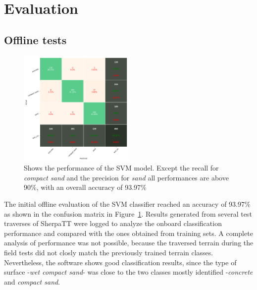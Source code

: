 \documentclass{article}
\begin{document}
\section{Evaluation}
\subsection{Offline tests}

\begin{figure}[h]
\centering
\includegraphics[width=0.5\textwidth]{../figures/confusionmatrix_Train.png}
\caption{\label{fig:confusionmatrix} Shows the performance of the SVM model. Except the recall for \emph{compact sand} and the precision for \emph{sand} all performances are above 90\%, with an overall accuracy of 93.97\%}
\end{figure}


The initial offline evaluation of the SVM classifier reached an accuracy of 93.97\% as shown in the confusion matrix in Figure~\ref{fig:confusionmatrix}.
Results generated from several test traverses of SherpaTT were logged to analyze the onboard classification performance and compared with the ones obtained from training sets. A complete analysis of performance was not possible, because the traversed terrain during the field tests did not closly match the previously trained terrain classes. Nevertheless, the software shows good classification results, since the type of surface -\emph{wet compact sand}- was close to the two classes mostly identified -\emph{concrete} and \emph{compact sand}.
\end{document}

